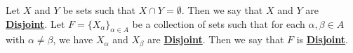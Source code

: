 \newcommand{\Disjoint}[0]{\textbf{\hyperref[def:Disjoint]{Disjoint}}\xspace}
\newcommand{\Disjointedness}[0]{\textbf{\hyperref[def:Disjoint]{Disjointedness}}\xspace}
\begin{df}[Disjoint]
\label{def:Disjoint}

\rm
    Let $X$ and $Y$ be sets such that 
    $X \cap Y = \emptyset$. 
    Then we say that $X$ and $Y$ are 
    \Disjoint. 
    Let $F=\{X_{\alpha}\}_{\alpha \in A}$ 
	be a collection of sets
    such that for each $\alpha, \beta \in A$ 
    with $\alpha \neq \beta$, we have 
    $X_\alpha$ 
	and 
	$X_\beta$
    are \Disjoint.
    Then we say that $F$ is \Disjoint. 
\end{df}
